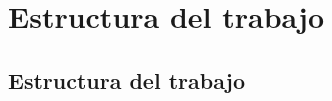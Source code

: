 \documentclass[10pt,compress]{beamer}
\begin{document}
	

{
	\begin{frame}[plain]
		\titlepage
	\end{frame}
}

\section{Estructura del trabajo}

\subsection{Estructura del trabajo}
\end{document}
